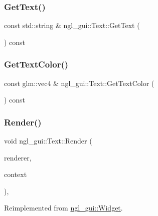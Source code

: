 \subsubsection{\texorpdfstring{Get\+Text()}{GetText()}}
{\footnotesize\ttfamily const std\+::string \& ngl\+\_\+gui\+::\+Text\+::\+Get\+Text (\begin{DoxyParamCaption}{ }\end{DoxyParamCaption}) const}

\mbox{\label{classngl__gui_1_1_text_a3836a75915b29cb21b0471e4cd589fb3}} 
\subsubsection{\texorpdfstring{Get\+Text\+Color()}{GetTextColor()}}
{\footnotesize\ttfamily const glm\+::vec4 \& ngl\+\_\+gui\+::\+Text\+::\+Get\+Text\+Color (\begin{DoxyParamCaption}{ }\end{DoxyParamCaption}) const}

\mbox{\label{classngl__gui_1_1_text_aa2dbe996a42ec05d5027ff972028ddf4}} 
\subsubsection{\texorpdfstring{Render()}{Render()}}
{\footnotesize\ttfamily void ngl\+\_\+gui\+::\+Text\+::\+Render (\begin{DoxyParamCaption}\item[{\mbox{\hyperlink{classngl__gui_1_1_g_u_i_renderer}{G\+U\+I\+Renderer}} \&}]{renderer,  }\item[{\mbox{\hyperlink{classngl__gui_1_1_g_u_i_rendering_context}{G\+U\+I\+Rendering\+Context}} \&}]{context }\end{DoxyParamCaption})\hspace{0.3cm}{\ttfamily [override]}, {\ttfamily [virtual]}}



Reimplemented from \mbox{\hyperlink{classngl__gui_1_1_widget_ac62483b01680572a40125f9208a86392}{ngl\+\_\+gui\+::\+Widget}}.

